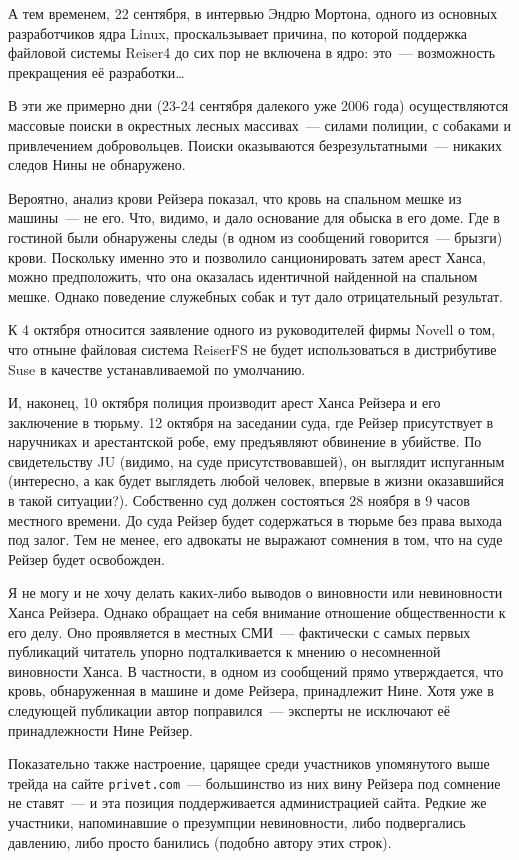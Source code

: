 А тем временем, 22 сентября, в интервью Эндрю Мортона, одного из основных разработчиков ядра Linux, проскальзывает причина, по которой поддержка файловой системы Reiser4 до сих пор не включена в ядро: это~--- возможность прекращения её разработки\dots 

В эти же примерно дни (23-24 сентября далекого уже 2006 года) осуществляются массовые поиски в окрестных лесных массивах~--- силами полиции, с собаками и привлечением добровольцев. Поиски оказываются безрезультатными~--- никаких следов Нины не обнаружено. 

Вероятно, анализ крови Рейзера показал, что кровь на спальном мешке из машины~--- не его. Что, видимо, и дало основание для обыска в его доме. Где в гостиной были обнаружены следы (в одном из сообщений говорится~--- брызги) крови. Поскольку именно это и позволило санционировать затем арест Ханса, можно предположить, что она оказалась идентичной найденной на спальном мешке. Однако поведение служебных собак и тут дало отрицательный результат. 

К 4 октября относится заявление одного из руководителей фирмы Novell о том, что отныне файловая система ReiserFS не будет использоваться в дистрибутиве Suse в качестве устанавливаемой по умолчанию. 

И, наконец, 10 октября полиция производит арест Ханса Рейзера и его заключение в тюрьму. 12 октября на заседании суда, где Рейзер присутствует в наручниках и арестантской робе, ему предъявляют обвинение в убийстве. По свидетельству JU (видимо, на суде присутствовавшей), он выглядит испуганным (интересно, а как будет выглядеть любой человек, впервые в жизни оказавшийся в такой ситуации?). Собственно суд должен состояться 28 ноября в 9 часов местного времени. До суда Рейзер будет содержаться в тюрьме без права выхода под залог. Тем не менее, его адвокаты не выражают сомнения в том, что на суде Рейзер будет освобожден. 

Я не могу и не хочу делать каких-либо выводов о виновности или невиновности Ханса Рейзера. Однако обращает на себя внимание отношение общественности к его делу. Оно проявляется в местных СМИ~--- фактически с самых первых публикаций читатель упорно подталкивается к мнению о несомненной виновности Ханса. В частности, в одном из сообщений прямо утверждается, что кровь, обнаруженная в машине и доме Рейзера, принадлежит Нине. Хотя уже в следующей публикации автор поправился~--- эксперты не исключают её принадлежности Нине Рейзер. 

Показательно также настроение, царящее среди участников упомянутого выше трейда на сайте \texttt{privet.com}~--- большинство из них вину Рейзера под сомнение не ставят~--- и эта позиция поддерживается администрацией сайта. Редкие же участники, напоминавшие о презумпции невиновности, либо подвергались давлению, либо просто банились (подобно автору этих строк). 

